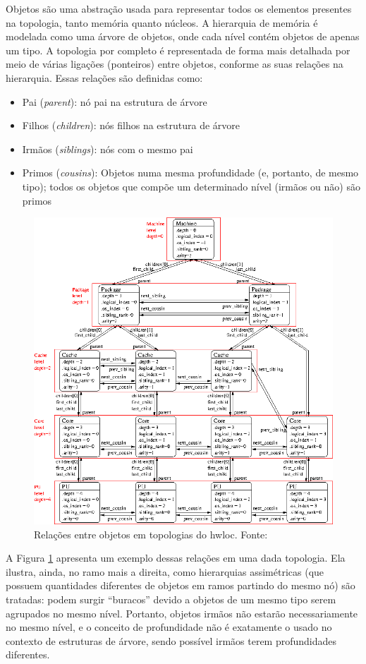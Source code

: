 Objetos são uma abstração usada para representar todos os elementos presentes na topologia, tanto memória quanto núcleos.
A hierarquia de memória é modelada como uma árvore de objetos, onde cada nível contém objetos de apenas um tipo.
A topologia por completo é representada de forma mais detalhada por meio de várias ligações (ponteiros) entre objetos, conforme as suas relações na hierarquia.
Essas relações são definidas como:
\begin{itemize}
	\item Pai (\textit{parent}): nó pai na estrutura de árvore
	\item Filhos (\textit{children}): nós filhos na estrutura de árvore
	\item Irmãos (\textit{siblings}): nós com o mesmo pai
	\item Primos (\textit{cousins}): Objetos numa mesma profundidade (e, portanto, de mesmo tipo); todos os objetos que compõe um determinado nível (irmãos ou não) são primos
\end{itemize}
\begin{figure}[h]
	\caption{Relações entre objetos em topologias do hwloc. Fonte: \cite{hwlocImg}}
	\label{fig:relacoes}
	\includegraphics[width=\textwidth]{rec/img/relacoes}
\end{figure}
A Figura \ref{fig:relacoes} apresenta um exemplo dessas relações em uma dada topologia.
Ela ilustra, ainda, no ramo mais a direita, como hierarquias assimétricas (que possuem quantidades diferentes de objetos em ramos partindo do mesmo nó) são tratadas: podem surgir ``buracos'' devido a objetos de um mesmo tipo serem agrupados no mesmo nível.
Portanto, objetos irmãos não estarão necessariamente no mesmo nível, e o conceito de profundidade não é exatamente o usado no contexto de estruturas de árvore, sendo possível irmãos terem profundidades diferentes.

